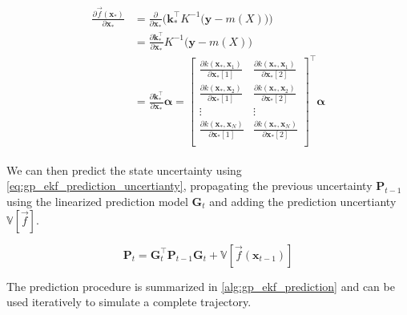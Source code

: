 \begin{align}\label{eq:gp_jacobian}
    \begin{split}
        \frac{\partial \vec{f}(\boldsymbol{x}_*)}{\partial \boldsymbol{x}_*} &= \frac{\partial}{\partial \boldsymbol{x}_*} \bigg(\boldsymbol{k}_*^\intercal K^{-1} \big(\boldsymbol{y} - m(X)\big)\bigg)\\
        &= \frac{\partial \boldsymbol{k}_*^\intercal}{\partial \boldsymbol{x}_*} K^{-1} \big(\boldsymbol{y} - m(X)\big)\\
        &= \frac{\partial \boldsymbol{k}_*^\intercal}{\partial \boldsymbol{x}_*} \boldsymbol{\alpha} = \begin{bmatrix}
            \frac{\partial k(\boldsymbol{x}_*, \boldsymbol{x}_1)}{\partial \boldsymbol{x}_*[1]} & \frac{\partial k(\boldsymbol{x}_*, \boldsymbol{x}_1)}{\partial \boldsymbol{x}_*[2]} \\
            \frac{\partial k(\boldsymbol{x}_*, \boldsymbol{x}_2)}{\partial \boldsymbol{x}_*[1]} & \frac{\partial k(\boldsymbol{x}_*, \boldsymbol{x}_2)}{\partial \boldsymbol{x}_*[2]} \\
            \vdots & \vdots \\
            \frac{\partial k(\boldsymbol{x}_*, \boldsymbol{x}_N)}{\partial \boldsymbol{x}_*[1]} & \frac{\partial k(\boldsymbol{x}_*, \boldsymbol{x}_N)}{\partial \boldsymbol{x}_*[2]} \\
        \end{bmatrix}^\intercal \boldsymbol{\alpha}
    \end{split}
\end{align}

We can then predict the state uncertainty using \cref{eq:gp_ekf_prediction_uncertianty}, propagating the previous uncertainty $\boldsymbol{P}_{t-1}$ using the linearized prediction model $\boldsymbol{G}_t$ and adding the prediction uncertianty $\mathbb{V}[\vec{f}]$.

\begin{equation}\label{eq:gp_ekf_prediction_uncertianty}
    \boldsymbol{P}_t = \boldsymbol{G}_t^\intercal \boldsymbol{P}_{t-1} \boldsymbol{G}_t + \mathbb{V}[\vec{f}(\boldsymbol{x}_{t-1})]
\end{equation}

The prediction procedure is summarized in \cref{alg:gp_ekf_prediction} and can be used iteratively to simulate a complete trajectory. 

